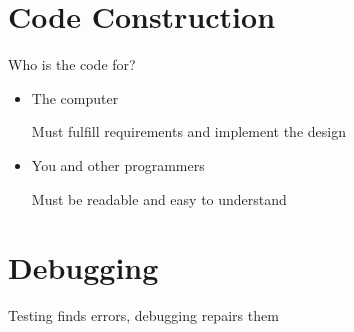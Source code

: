 \documentclass[12pt]{article}
\begin{document}
\section{Code Construction}

Who is the code for?
\begin{itemize}
    \item The computer
    
    Must fulfill requirements and implement the design

    \item You and other programmers
    
    Must be readable and easy to understand 
\end{itemize}

\section{Debugging}

Testing finds errors, debugging repairs them
\end{document}
